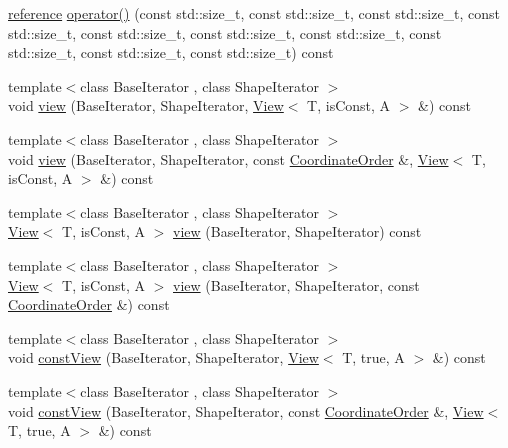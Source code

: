 \begin{DoxyCompactItemize}
\item 
\hyperlink{classandres_1_1View_aebdd1f19272b743b4422ff8ba18fc11a}{reference} \hyperlink{classandres_1_1View_aa9fa791b4f14b9c8b8c15aea0f53527e}{operator()} (const std\+::size\+\_\+t, const std\+::size\+\_\+t, const std\+::size\+\_\+t, const std\+::size\+\_\+t, const std\+::size\+\_\+t, const std\+::size\+\_\+t, const std\+::size\+\_\+t, const std\+::size\+\_\+t, const std\+::size\+\_\+t, const std\+::size\+\_\+t) const 
\item 
{\footnotesize template$<$class Base\+Iterator , class Shape\+Iterator $>$ }\\void \hyperlink{classandres_1_1View_a190ebba7d686129ac18075e7650e0341}{view} (Base\+Iterator, Shape\+Iterator, \hyperlink{classandres_1_1View}{View}$<$ T, is\+Const, A $>$ \&) const 
\item 
{\footnotesize template$<$class Base\+Iterator , class Shape\+Iterator $>$ }\\void \hyperlink{classandres_1_1View_a81d4d44cfe0b4373f5488d6b01346189}{view} (Base\+Iterator, Shape\+Iterator, const \hyperlink{namespaceandres_a2ac8b7aa89d44e8188a7c0ba50f4306b}{Coordinate\+Order} \&, \hyperlink{classandres_1_1View}{View}$<$ T, is\+Const, A $>$ \&) const 
\item 
{\footnotesize template$<$class Base\+Iterator , class Shape\+Iterator $>$ }\\\hyperlink{classandres_1_1View}{View}$<$ T, is\+Const, A $>$ \hyperlink{classandres_1_1View_a4da55e4518bb93761e275b5340373ccd}{view} (Base\+Iterator, Shape\+Iterator) const 
\item 
{\footnotesize template$<$class Base\+Iterator , class Shape\+Iterator $>$ }\\\hyperlink{classandres_1_1View}{View}$<$ T, is\+Const, A $>$ \hyperlink{classandres_1_1View_a6ec3e4ec58da8405e3e8b4bf6d4912e4}{view} (Base\+Iterator, Shape\+Iterator, const \hyperlink{namespaceandres_a2ac8b7aa89d44e8188a7c0ba50f4306b}{Coordinate\+Order} \&) const 
\item 
{\footnotesize template$<$class Base\+Iterator , class Shape\+Iterator $>$ }\\void \hyperlink{classandres_1_1View_aeeaae20aebd1f90c3b3f1aba2071e98d}{const\+View} (Base\+Iterator, Shape\+Iterator, \hyperlink{classandres_1_1View}{View}$<$ T, true, A $>$ \&) const 
\item 
{\footnotesize template$<$class Base\+Iterator , class Shape\+Iterator $>$ }\\void \hyperlink{classandres_1_1View_a331568a945dc85ab30f03de5f993b792}{const\+View} (Base\+Iterator, Shape\+Iterator, const \hyperlink{namespaceandres_a2ac8b7aa89d44e8188a7c0ba50f4306b}{Coordinate\+Order} \&, \hyperlink{classandres_1_1View}{View}$<$ T, true, A $>$ \&) const 

\end{DoxyCompactItemize}
